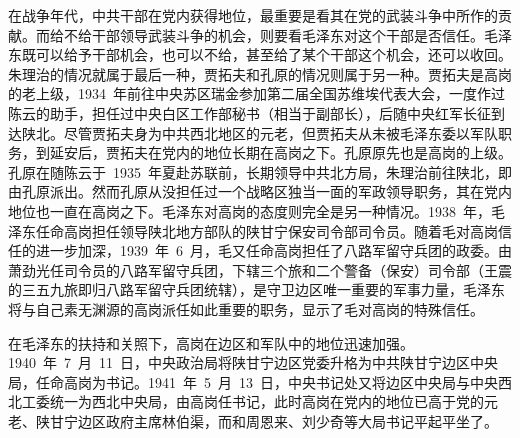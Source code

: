在战争年代，中共干部在党内获得地位，最重要是看其在党的武装斗争中所作的贡献。而给不给干部领导武装斗争的机会，则要看毛泽东对这个干部是否信任。毛泽东既可以给予干部机会，也可以不给，甚至给了某个干部这个机会，还可以收回。朱理治的情况就属于最后一种，贾拓夫和孔原的情况则属于另一种。贾拓夫是高岗的老上级，1934~年前往中央苏区瑞金参加第二届全国苏维埃代表大会，一度作过陈云的助手，担任过中央白区工作部秘书（相当于副部长），后随中央红军长征到达陕北。尽管贾拓夫身为中共西北地区的元老，但贾拓夫从未被毛泽东委以军队职务，到延安后，贾拓夫在党内的地位长期在高岗之下。孔原原先也是高岗的上级。孔原在随陈云于~1935~年夏赴苏联前，长期领导中共北方局，朱理治前往陕北，即由孔原派出。然而孔原从没担任过一个战略区独当一面的军政领导职务，其在党内地位也一直在高岗之下。毛泽东对高岗的态度则完全是另一种情况。1938~年，毛泽东任命高岗担任领导陕北地方部队的陕甘宁保安司令部司令员。随着毛对高岗信任的进一步加深，1939~年~6~月，毛又任命高岗担任了八路军留守兵团的政委。由萧劲光任司令员的八路军留守兵团，下辖三个旅和二个警备（保安）司令部（王震的三五九旅即归八路军留守兵团统辖），是守卫边区唯一重要的军事力量，毛泽东将与自己素无渊源的高岗派任如此重要的职务，显示了毛对高岗的特殊信任。

在毛泽东的扶持和关照下，高岗在边区和军队中的地位迅速加强。1940~年~7~月~11~日，中央政治局将陕甘宁边区党委升格为中共陕甘宁边区中央局，任命高岗为书记。1941~年~5~月~13~日，中央书记处又将边区中央局与中央西北工委统一为西北中央局，由高岗任书记，此时高岗在党内的地位已高于党的元老、陕甘宁边区政府主席林伯渠，而和周恩来、刘少奇等大局书记平起平坐了。


